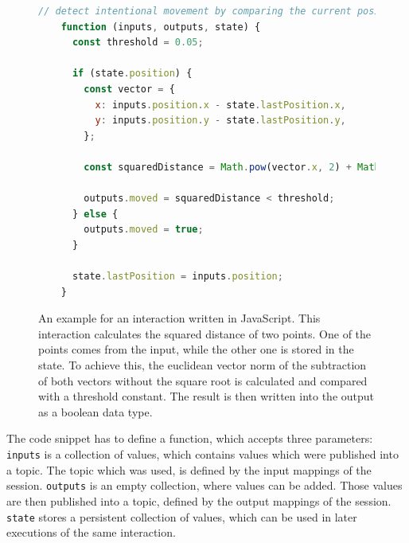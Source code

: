 \begin{figure}[H]
  \begin{lstlisting}[language=JavaScript]
    // detect intentional movement by comparing the current position with a previous one
    function (inputs, outputs, state) {
      const threshold = 0.05;

      if (state.position) {
        const vector = {
          x: inputs.position.x - state.lastPosition.x,
          y: inputs.position.y - state.lastPosition.y,
        };
  
        const squaredDistance = Math.pow(vector.x, 2) + Math.pow(vector.y, 2);
  
        outputs.moved = squaredDistance < threshold;
      } else {
        outputs.moved = true;
      }

      state.lastPosition = inputs.position;
    }
  \end{lstlisting}
  \caption[A basic UBII interaction in JavaScript.]{An example for an interaction written in JavaScript. This interaction calculates the squared distance of two points. One of the points comes from the input, while the other one is stored in the state. To achieve this, the euclidean vector norm of the subtraction of both vectors without the square root is calculated and compared with a threshold constant. The result is then written into the output as a boolean data type.}\label{fig:ubii-interaction-example}
\end{figure}

The code snippet has to define a function, which accepts three parameters: 
\lstinline{inputs} is a collection of values, which contains values which were published into a topic. The topic which was used, is defined by the input mappings of the session. \lstinline{outputs} is an empty collection, where values can be added. Those values are then published into a topic, defined by the output mappings of the session. \lstinline{state} stores a persistent collection of values, which can be used in later executions of the same interaction.